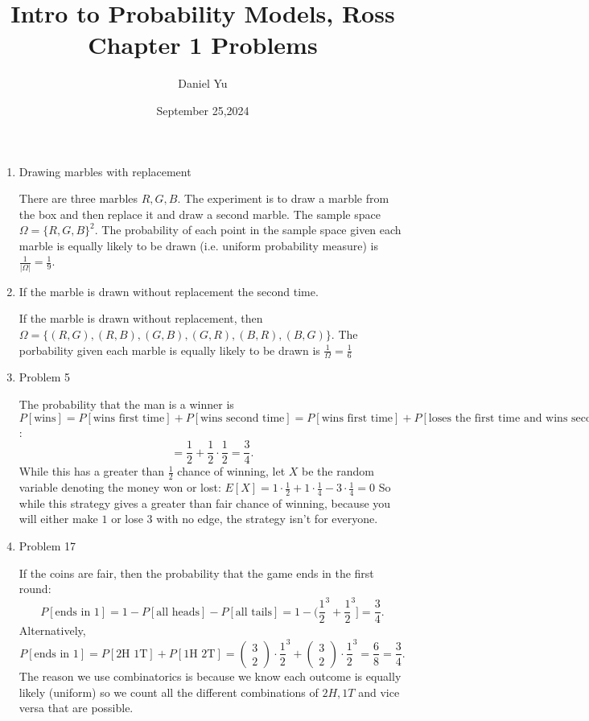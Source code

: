 \documentclass[a4paper]{article}
\title{\Huge{Intro to Probability Models, Ross}\\Chapter 1 Problems}
\author{\huge{Daniel Yu}}
\date{September 25,2024}
\begin{document}
\maketitle
\newpage%
\pagebreak
\begin{enumerate}
  \item Drawing marbles with replacement
    \begin{note}
      There are three marbles $R,G,B$. The experiment is to draw a marble from the box and then 
      replace it and draw a second marble. The sample space  $\Omega = \{R,G,B\}^2$. The probability
      of each point in the sample space given each marble is equally likely to be drawn (i.e.
      uniform probability measure) is $\frac{1}{|\Omega|}=\frac{1}{9}$.
    \end{note}
  \item If the marble is drawn without replacement the second time.
    \begin{note}
      If the marble is drawn without replacement, then $\Omega = \{\left( R,G \right), \left( R,B \right), 
      \left( G,B \right), (G,R), (B,R), (B,G) \}$. The porbability given each marble is equally likely to
      be drawn is $\frac{1}{\Omega}= \frac{1}{6}$
    \end{note}
  \item Problem 5
    \begin{note}
      The probability that the man is a winner is $P[\text{wins}] = P[\text{wins first time}] + P[\text{wins second time}] 
      = P[\text{wins first time}] + P[\text{loses the first time and wins second time}]$:
       \[
      = \frac{1}{2} + \frac{1}{2} \cdot \frac{1}{2} = \frac{3}{4}
      .\]
      While this has a greater than $\frac{1}{2}$ chance of winning, let $X$ be the random variable  denoting 
      the money won or lost:
      $E[X] = 1 \cdot \frac{1}{2} + 1 \cdot \frac{1}{4} - 3 \cdot \frac{1}{4} = 0$
      So while this strategy gives a greater than fair chance of winning, because you will either make  $1$ or 
      lose $3$ with no edge, the strategy isn't for everyone.
    \end{note}
  \item Problem 17
    \begin{note}
      If the coins are fair, then the probability that the game ends in the first round:
      \[
        P[\text{ends in 1}] = 1 - P[\text{all heads}] - P[\text{all tails}] = 1 - (\frac{1}{2}^{3} + \frac{1}{2}^{3}]
        = \frac{3}{4}
      .\] 
      Alternatively,
      \[
        P[\text{ends in 1}] = P[\text{2H 1T}] + P[\text{1H 2T}] = \begin{pmatrix} 3 \\ 2 \end{pmatrix} \cdot
        \frac{1}{2}^{3} + \begin{pmatrix} 3 \\ 2 \end{pmatrix} \cdot \frac{1}{2}^{3} = \frac{6}{8} = \frac{3}{4}
      .\]
      The reason we use combinatorics is because we know each outcome is equally likely (uniform) so we count all the 
      different combinations of $2H,1T$ and vice versa that are possible. \\


\end{note}
\end{enumerate}
\end{document}
